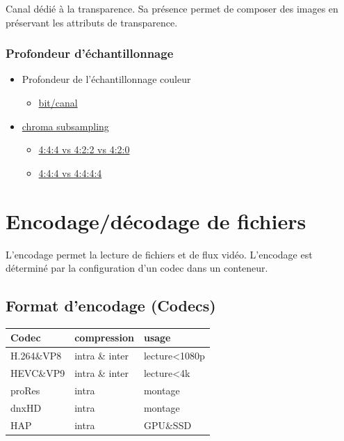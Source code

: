 \documentclass[
  french,
]{book}
\providecommand{\tightlist}{%
  \setlength{\itemsep}{0pt}\setlength{\parskip}{0pt}}
\begin{document}
Canal dédié à la transparence.
Sa présence permet de composer des images en préservant les attributs de transparence.

\hypertarget{profondeur-duxe9chantillonnage}{%
\subsubsection{Profondeur d'échantillonnage}\label{profondeur-duxe9chantillonnage}}

\begin{itemize}
\tightlist
\item
  Profondeur de l'échantillonnage couleur

  \begin{itemize}
  \tightlist
  \item
    \href{https://en.wikipedia.org/wiki/Color_depth}{bit/canal}\\
  \end{itemize}
\item
  \href{https://en.wikipedia.org/wiki/Chroma_subsampling\#Sampling_systems_and_ratios}{chroma subsampling}

  \begin{itemize}
  \tightlist
  \item
    \href{https://upload.wikimedia.org/wikipedia/commons/0/06/Colorcomp.jpg}{4:4:4 vs 4:2:2 vs 4:2:0}
  \item
    \href{https://en.wikipedia.org/wiki/Alpha_compositing}{4:4:4 vs 4:4:4:4}
  \end{itemize}
\end{itemize}

\hypertarget{lexique_fichiers}{%
\section{Encodage/décodage de fichiers}\label{lexique_fichiers}}

L'encodage permet la lecture de fichiers et de flux vidéo.
L'encodage est déterminé par la configuration d'un codec dans un conteneur.

\hypertarget{format-dencodage-codecs}{%
\subsection{Format d'encodage (Codecs)}\label{format-dencodage-codecs}}

\begin{longtable}[]{@{}lll@{}}
\toprule
Codec & compression & usage\tabularnewline
\midrule
\endhead
H.264\&VP8 & intra \& inter & lecture\textless1080p\tabularnewline
HEVC\&VP9 & intra \& inter & lecture\textless4k\tabularnewline
proRes & intra & montage\tabularnewline
dnxHD & intra & montage\tabularnewline
HAP & intra & GPU\&SSD\tabularnewline
\bottomrule
\end{longtable}
\end{document}
